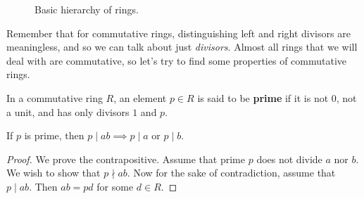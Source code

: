   \begin{figure}[H]
    \centering 
    \caption{Basic hierarchy of rings.} 
    \label{fig:ring_hierarchy}
  \end{figure} 
  
  Remember that for commutative rings, distinguishing left and right divisors are meaningless, and so we can talk about just \textit{divisors}. Almost all rings that we will deal with are commutative, so let's try to find some properties of commutative rings.  

  \begin{definition}
    In a commutative ring $R$, an element $p \in R$ is said to be \textbf{prime} if it is not $0$, not a unit, and has only divisors $1$ and $p$. 
  \end{definition}

  \begin{lemma}
    If $p$ is prime, then $p \mid ab \implies p \mid a$ or $p \mid b$.  
  \end{lemma}
  \begin{proof}
    We prove the contrapositive. Assume that prime $p$ does not divide $a$ nor $b$. We wish to show that $p \nmid ab$. Now for the sake of contradiction, assume that $p \mid ab$. Then $ab = pd$ for some $d \in R$. 
  \end{proof}

